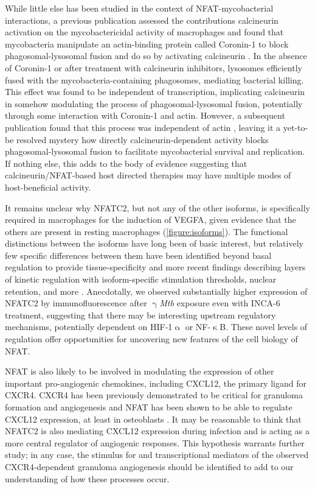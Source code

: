 While little else has been studied in the context of NFAT\hyp{}mycobacterial interactions, a previous publication assessed the contributions calcineurin activation on the mycobactericidal activity of macrophages and found that mycobacteria manipulate an actin\hyp{}binding protein called Coronin\hyp{}1 to block phagosomal\hyp{}lysosomal fusion and do so by activating calcineurin \citep{Jayachandran2007}. In the absence of Coronin\hyp{}1 or after treatment with calcineurin inhibitors, lysosomes efficiently fused with the mycobacteria\hyp{}containing phagosomes, mediating bacterial killing. This effect was found to be independent of transcription, implicating calcineurin in somehow modulating the process of phagosomal\hyp{}lysosomal fusion, potentially through some interaction with Coronin\hyp{}1 and actin. However, a subsequent publication found that this process was independent of actin \citep{Jayachandran2008}, leaving it a yet\hyp{}to\hyp{}be resolved mystery how directly calcineurin\hyp{}dependent activity blocks phagosomal\hyp{}lysosomal fusion to facilitate mycobacterial survival and replication. If nothing else, this adds to the body of evidence suggesting that calcineurin/NFAT\hyp{}based host directed therapies may have multiple modes of host\hyp{}beneficial activity.

It remains unclear why NFATC2, but not any of the other isoforms, is specifically required in macrophages for the induction of VEGFA, given evidence that the others are present in resting macrophages (\autoref{figure:isoforms}). The functional distinctions between the isoforms have long been of basic interest, but relatively few specific differences between them have been identified beyond basal regulation to provide tissue\hyp{}specificity and more recent findings describing layers of kinetic regulation with isoform\hyp{}specific stimulation thresholds, nuclear retention, and more \citep{Lyakh1997, Rao1997, Kar2014, Kar2015, Kar2016, Yissachar2013}. Anecdotally, we observed substantially higher expression of NFATC2 by immunofluorescence after $\upgamma$\textit{Mtb} exposure even with INCA\hyp{}6 treatment, suggesting that there may be interesting upstream regulatory mechanisms, potentially dependent on HIF\hyp{}1$\upalpha$ or NF\hyp{}$\upkappa$B. These novel levels of regulation offer opportunities for uncovering new features of the cell biology of NFAT.

NFAT is also likely to be involved in modulating the expression of other important pro\hyp{}angiogenic chemokines, including CXCL12, the primary ligand for CXCR4. CXCR4 has been previously demonstrated to be critical for granuloma formation and angiogenesis \citep{Torraca2017} and NFAT has been shown to be able to regulate CXCL12 expression, at least in osteoblasts \citep{Sesler2013}. It may be reasonable to think that NFATC2 is also mediating CXCL12 expression during infection and is acting as a more central regulator of angiogenic responses. This hypothesis warrants further study; in any case, the stimulus for and transcriptional mediators of the observed CXCR4\hyp{}dependent granuloma angiogenesis should be identified to add to our understanding of how these processes occur.


